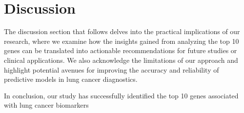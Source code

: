 \section{Discussion} \label{sec:discussion}
The discussion section that follows delves into the practical implications of our research,
where we examine how the insights gained from analyzing the top 10 genes can be translated into actionable recommendations
for future studies or clinical applications.
We also acknowledge the limitations of our approach and
highlight potential avenues for improving the accuracy and reliability of predictive models in lung cancer diagnostics.






%

In conclusion, our study has successfully identified the top 10 genes associated with lung cancer biomarkers
